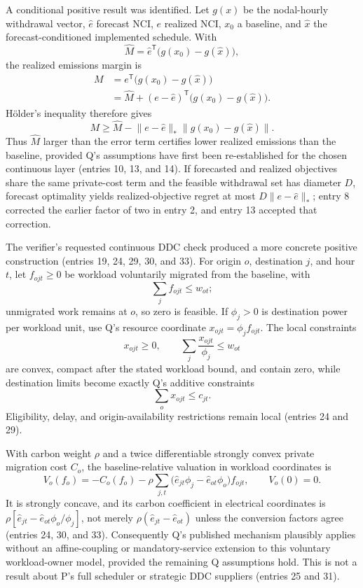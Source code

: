 \documentclass{article}
\begin{document}
A conditional positive result was identified. Let $g(x)$ be the nodal-hourly withdrawal vector, $\widehat e$ forecast NCI, $e$ realized NCI, $x_0$ a baseline, and $\widehat x$ the forecast-conditioned implemented schedule. With
\[
 \widehat M=\widehat e^{\mathsf T}\bigl(g(x_0)-g(\widehat x)\bigr),
\]
the realized emissions margin is
\begin{align*}
 M
 &=e^{\mathsf T}\bigl(g(x_0)-g(\widehat x)\bigr)\\
 &=\widehat M+(e-\widehat e)^{\mathsf T}
     \bigl(g(x_0)-g(\widehat x)\bigr).
\end{align*}
H\"older's inequality therefore gives
\[
 M\geq \widehat M-\lVert e-\widehat e\rVert_*
 \lVert g(x_0)-g(\widehat x)\rVert.
\]
Thus $\widehat M$ larger than the error term certifies lower realized emissions than the baseline, provided Q's assumptions have first been re-established for the chosen continuous layer (entries 10, 13, and 14). If forecasted and realized objectives share the same private-cost term and the feasible withdrawal set has diameter $D$, forecast optimality yields realized-objective regret at most $D\lVert e-\widehat e\rVert_*$; entry 8 corrected the earlier factor of two in entry 2, and entry 13 accepted that correction.

The verifier's requested continuous DDC check produced a more concrete positive construction (entries 19, 24, 29, 30, and 33). For origin $o$, destination $j$, and hour $t$, let $f_{ojt}\geq0$ be workload voluntarily migrated from the baseline, with
\[
 \sum_j f_{ojt}\leq w_{ot};
\]
unmigrated work remains at $o$, so zero is feasible. If $\phi_j>0$ is destination power per workload unit, use Q's resource coordinate $x_{ojt}=\phi_j f_{ojt}$. The local constraints
\[
 x_{ojt}\geq0,
 \qquad
 \sum_j\frac{x_{ojt}}{\phi_j}\leq w_{ot}
\]
are convex, compact after the stated workload bound, and contain zero, while destination limits become exactly Q's additive constraints
\[
 \sum_o x_{ojt}\leq c_{jt}.
\]
Eligibility, delay, and origin-availability restrictions remain local (entries 24 and 29).

With carbon weight $\rho$ and a twice differentiable strongly convex private migration cost $C_o$, the baseline-relative valuation in workload coordinates is
\[
 V_o(f_o)=-C_o(f_o)-\rho\sum_{j,t}
 \bigl(\widehat e_{jt}\phi_j-\widehat e_{ot}\phi_o\bigr)f_{ojt},
 \qquad V_o(0)=0.
\]
It is strongly concave, and its carbon coefficient in electrical coordinates is $\rho[\widehat e_{jt}-\widehat e_{ot}\phi_o/\phi_j]$, not merely $\rho(\widehat e_{jt}-\widehat e_{ot})$ unless the conversion factors agree (entries 24, 30, and 33). Consequently Q's published mechanism plausibly applies without an affine-coupling or mandatory-service extension to this voluntary workload-owner model, provided the remaining Q assumptions hold. This is not a result about P's full scheduler or strategic DDC suppliers (entries 25 and 31).
\end{document}
